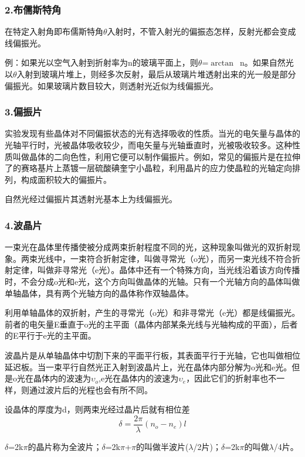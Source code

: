 \documentclass[12pt,a4paper,UTF8]{ctexart}
\begin{document}
	\subsubsection*{2.布儒斯特角}

	在特定入射角即布儒斯特角$\theta$入射时，不管入射光的偏振态怎样，反射光都会变成线偏振光。\par
	例：如果光以空气入射到折射率为n的玻璃平面上，则$\theta$=$\arctan$~n。如果自然光以$\theta$入射到玻璃片堆上，则经多次反射，最后从玻璃片堆透射出来的光一般是部分偏振光。如果玻璃片数目较大，则透射光近似为线偏振光。

	\subsubsection*{3.偏振片}

	实验发现有些晶体对不同偏振状态的光有选择吸收的性质。当光的电矢量与晶体的光轴平行时，光被晶体吸收较少，而电矢量与光轴垂直时，光被吸收较多。这种性质叫做晶体的二向色性，利用它便可以制作偏振片。例如，常见的偏振片是在拉伸了的赛珞基片上蒸镀一层硫酸碘奎宁小晶粒，利用晶片的应力使晶粒的光轴定向排列，构成面积较大的偏振片。\par
	自然光经过偏振片其透射光基本上为线偏振光。

	\subsubsection*{4.波晶片}

	一束光在晶体里传播使被分成两束折射程度不同的光，这种现象叫做光的双折射现象。两束光线中，一束符合折射定律，叫做寻常光（o光），而另一束光线不符合折射定律，叫做非寻常光（e光）。晶体中还有一个特殊方向，当光线沿着该方向传播时，不会分成o光和e光，这个方向叫做晶体的光轴。只有一个光轴方向的晶体叫做单轴晶体，具有两个光轴方向的晶体称作双轴晶体。\par
	利用单轴晶体的双折射，产生的寻常光（o光）和非寻常光（e光）都是线偏振光。前者的电矢量E垂直于o光的主平面（晶体内部某条光线与光轴构成的平面），后者的E平行于e光的主平面。\par
	波晶片是从单轴晶体中切割下来的平面平行板，其表面平行于光轴，它也叫做相位延迟板。当一束平行自然光正入射到波晶片上，光在晶体内部分解为o光和e光。但是o光在晶体内的波速为$\upsilon_o$,e光在晶体内的波速为$\upsilon_e$，因此它们的折射率也不一样，则通过波片后的光程也会有所不同。\par
	设晶体的厚度为d，则两束光经过晶片后就有相位差
	\begin{equation}
		\delta=\frac{2\pi}{\lambda}(n_o-n_e)l
	\end{equation}
\par
	$\delta$=2k$\pi$的晶片称为全波片；$\delta$=2k$\pi$+$\pi$的叫做半波片($\lambda$/2片)；$\delta$=2k$\pi$的叫做$\lambda$/4片。
\end{document}
